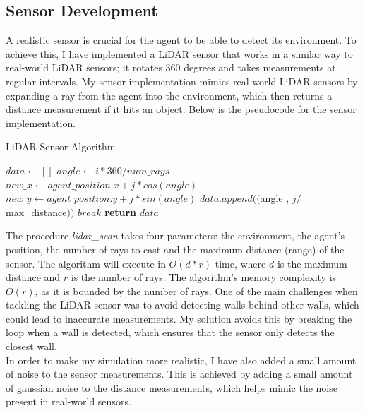 \documentclass[12pt]{article}
\begin{document}
\subsection{Sensor Development}
A realistic sensor is crucial for the agent to be able to detect its environment. To achieve this, I have implemented a LiDAR sensor
that works in a similar way to real-world LiDAR sensors; it rotates 360 degrees and takes measurements at regular intervals. My sensor
implementation mimics real-world LiDAR sensors by expanding a ray from the agent into the environment, which then returns a distance
measurement if it hits an object.  Below is the pseudocode for the sensor implementation.\\
\begin{algorithm}[H]
    \caption{LiDAR Sensor Algorithm}\label{alg:lidar_sensor}
    \begin{algorithmic}
            \State $data \gets []$
                \State $angle \gets i * 360 / num\_rays$
                    \State $new\_x \gets agent\_position.x + j * cos(angle)$
                    \State $new\_y \gets agent\_position.y + j * sin(angle)$
                        \State $data.append(($angle , $j / $max\_distance$))$
                        \State $break$
                    \EndIf
                \EndFor
            \EndFor
            \State \textbf{return} $data$
        \EndFunction{}
    \end{algorithmic}
\end{algorithm}
The procedure \textit{lidar\_scan} takes four parameters: the environment, the agent's position, the number of rays to cast and the
maximum distance (range) of the sensor. The algorithm will execute in \(O(d * r)\) time, where \(d\) is the maximum distance and \(r\) is
the number of rays. The algorithm's memory complexity is \(O(r)\), as it is bounded by the number of rays. One of the main challenges when
tackling the LiDAR sensor was to avoid detecting walls behind other walls, which could lead to inaccurate measurements. My solution avoids
this by breaking the loop when a wall is detected, which ensures that the sensor only detects the closest wall.\\
In order to make my simulation more realistic, I have also added a small amount of noise to the sensor measurements. This is achieved by
adding a small amount of gaussian noise to the distance measurements, which helps mimic the noise present in real-world sensors.\\
\end{document}
